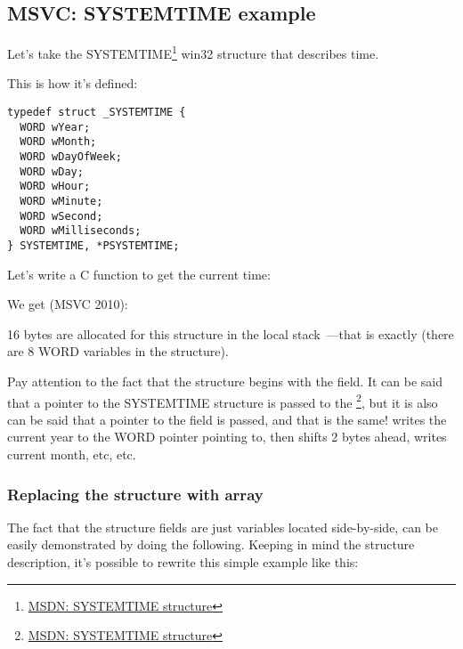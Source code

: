 \subsection{MSVC: SYSTEMTIME example}
\label{sec:SYSTEMTIME}

\newcommand{\FNSYSTEMTIME}{\footnote{\href{http://go.yurichev.com/17260}{MSDN: SYSTEMTIME structure}}}

Let's take the SYSTEMTIME\FNSYSTEMTIME{} win32 structure that describes time.

This is how it's defined:

\begin{lstlisting}[caption=WinBase.h]
typedef struct _SYSTEMTIME {
  WORD wYear;
  WORD wMonth;
  WORD wDayOfWeek;
  WORD wDay;
  WORD wHour;
  WORD wMinute;
  WORD wSecond;
  WORD wMilliseconds;
} SYSTEMTIME, *PSYSTEMTIME;
\end{lstlisting}

Let's write a C function to get the current time:



We get (MSVC 2010):



16 bytes are allocated for this structure in the local stack~---that is exactly 
(there are 8 WORD variables in the structure).

\newcommand{\FNMSDNGST}{\footnote{\href{http://go.yurichev.com/17261}{MSDN: GetSystemTime function}}}

Pay attention to the fact that the structure begins with the  field.
It can be said that a pointer to the SYSTEMTIME structure is passed to the \FNSYSTEMTIME,
but it is also can be said that a pointer to the  field is passed, and that is the same!
 writes the current year to the WORD pointer pointing to, then shifts 2 bytes
ahead, writes current month, etc, etc.



\subsubsection{Replacing the structure with array}

The fact that the structure fields are just variables located side-by-side, can be easily demonstrated by doing the following.
Keeping in mind the  structure description, it's possible to rewrite this simple example like this:

